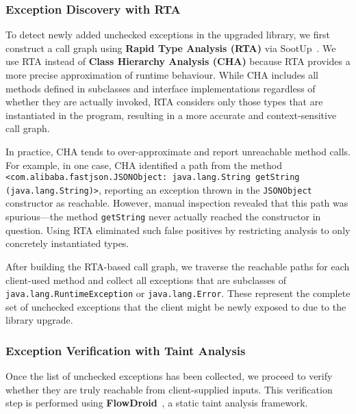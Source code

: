 \subsubsection{Exception Discovery with RTA}

To detect newly added unchecked exceptions in the upgraded library, we first construct a call graph using \textbf{Rapid Type Analysis (RTA)} via SootUp~\cite{Karakaya24:_sootup}. We use RTA instead of \textbf{Class Hierarchy Analysis (CHA)} because RTA provides a more precise approximation of runtime behaviour. While CHA includes all methods defined in subclasses and interface implementations regardless of whether they are actually invoked, RTA considers only those types that are instantiated in the program, resulting in a more accurate and context-sensitive call graph.

In practice, CHA tends to over-approximate and report unreachable method calls. For example, in one case, CHA identified a path from the method \texttt{<com.alibaba.fastjson.JSONObject: java.lang.String getString (java.lang.String)>}, reporting an exception thrown in the \texttt{JSONObject} constructor as reachable. However, manual inspection revealed that this path was spurious—the method \texttt{getString} never actually reached the constructor in question. Using RTA eliminated such false positives by restricting analysis to only concretely instantiated types.

After building the RTA-based call graph, we traverse the reachable paths for each client-used method and collect all exceptions that are subclasses of \texttt{java.lang.RuntimeException} or \texttt{java.lang.Error}. These represent the complete set of unchecked exceptions that the client might be newly exposed to due to the library upgrade.

\subsubsection{Exception Verification with Taint Analysis}

Once the list of unchecked exceptions has been collected, we proceed to verify whether they are truly reachable from client-supplied inputs. This verification step is performed using \textbf{FlowDroid}~\cite{Arzt14:_flowdroid}, a static taint analysis framework. 

